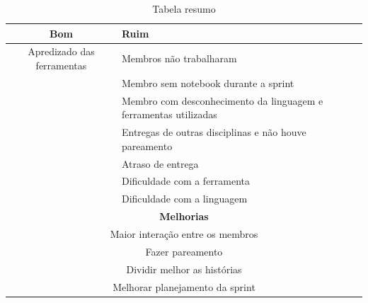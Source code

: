 \begin{table}[H]
    \centering
    \caption{Tabela resumo}
    \label{tabelaResumoSprint}
    \begin{tabular}{|c|p{10cm}|}
        \hline
        \textbf{Bom} & \textbf{Ruim} \\
        \hline
        Apredizado das ferramentas  &  Membros não trabalharam \\
        & Membro sem notebook durante a sprint \\
        & Membro com desconhecimento da linguagem e ferramentas utilizadas\\
        &  Entregas de outras disciplinas e não houve pareamento \\
        &  Atraso de entrega\\
        &  Dificuldade com a ferramenta\\
        & Dificuldade com a linguagem\\
        \hline
        \multicolumn{2}{|c|}{\textbf{Melhorias}}\\
        \hline
        \multicolumn{2}{|c|}{Maior interação entre os membros} \\
        \multicolumn{2}{|c|}{Fazer pareamento} \\
        \multicolumn{2}{|c|}{Dividir melhor as histórias} \\
        \multicolumn{2}{|c|}{Melhorar planejamento da sprint} \\
        \hline
    \end{tabular}
\end{table}

